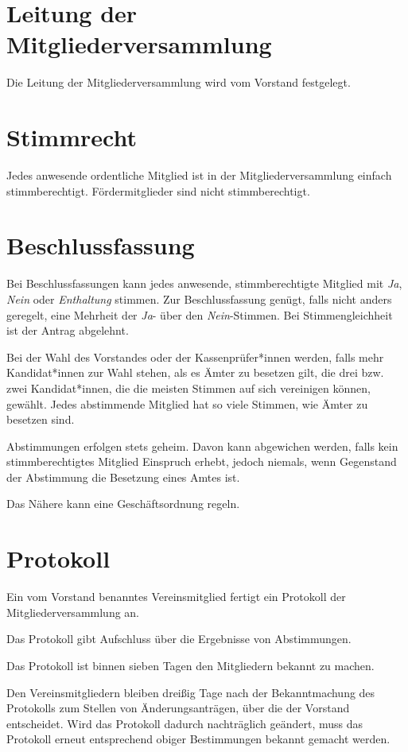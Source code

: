 \section{Leitung der Mitgliederversammlung}
Die Leitung der Mitgliederversammlung wird vom Vorstand festgelegt.

\section{Stimmrecht}
Jedes anwesende ordentliche Mitglied ist in der Mitgliederversammlung einfach stimmberechtigt. Fördermitglieder sind nicht stimmberechtigt.

\section{Beschlussfassung}
\begin{absätze}
    \item Bei Beschlussfassungen kann jedes anwesende, stimmberechtigte Mitglied mit \textit{Ja}, \textit{Nein} oder \textit{Enthaltung} stimmen. Zur Beschlussfassung genügt, falls nicht anders geregelt, eine Mehrheit der \textit{Ja}- über den \textit{Nein}-Stimmen. Bei Stimmengleichheit ist der Antrag abgelehnt.
    \item Bei der Wahl des Vorstandes oder der Kassenprüfer*innen werden, falls mehr Kandidat*innen zur Wahl stehen, als es Ämter zu besetzen gilt, die drei bzw. zwei Kandidat*innen, die die meisten Stimmen auf sich vereinigen können, gewählt. Jedes abstimmende Mitglied hat so viele Stimmen, wie Ämter zu besetzen sind.
    \item Abstimmungen erfolgen stets geheim. Davon kann abgewichen werden, falls kein stimmberechtigtes Mitglied Einspruch erhebt, jedoch niemals, wenn Gegenstand der Abstimmung die Besetzung eines Amtes ist.
    \item Das Nähere kann eine Geschäftsordnung regeln.
\end{absätze}

\section{Protokoll}
\begin{absätze}
    \item Ein vom Vorstand benanntes Vereinsmitglied fertigt ein Protokoll der Mitgliederversammlung an.
    \item Das Protokoll gibt Aufschluss über die Ergebnisse von Abstimmungen.
    \item Das Protokoll ist binnen sieben Tagen den Mitgliedern bekannt zu machen.
    \item Den Vereinsmitgliedern bleiben dreißig Tage nach der Bekanntmachung des Protokolls zum Stellen von Änderungsanträgen, über die der Vorstand entscheidet. Wird das Protokoll dadurch nachträglich geändert, muss das Protokoll erneut entsprechend obiger Bestimmungen bekannt gemacht werden.
\end{absätze}

